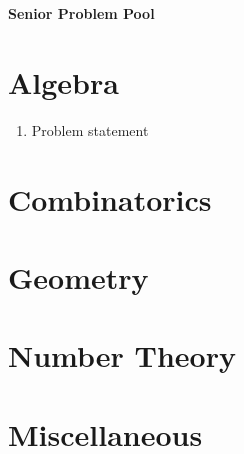 \documentclass{article}
\begin{document}
\begin{center}
\textbf{\huge Senior Problem Pool}
\end{center}

\section*{Algebra}

\begin{enumerate}[1.]

\item %
Problem statement

\end{enumerate}

\section*{Combinatorics}

\section*{Geometry}

\section*{Number Theory}

\section*{Miscellaneous}
\end{document}
